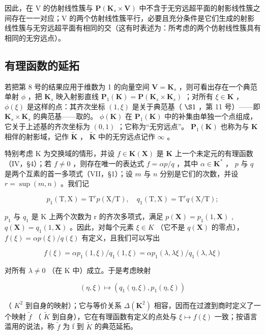 因此，在 V 的仿射线性簇与 \(\mathbf{P}(\mathbf{K}_{s} \times \mathbf{V})\) 中不含于无穷远超平面的射影线性簇之间存在一一对应；V 的两个仿射线性簇平行，必要且充分条件是它们生成的射影线性簇与无穷远超平面有相同的交（这有时表述为：所考虑的两个仿射线性簇具有相同的无穷远点）。

\subsection{有理函数的延拓}

若把第 8 号的结果应用于维数为 1 的向量空间 \(\mathbf{V} = \mathbf{K}_s\) ，则可看出存在一个典范单射 \(\phi\) ，把 \(\mathbf{K}_s\) 映入射影直线 \(\mathbf{P}_1(\mathbf{K}) = \mathbf{P}(\mathbf{K}_s \times \mathbf{K}_s)\) ；对所有 \(\xi \in \mathbf{K}\) ， \(\phi(\xi)\) 是这样的点：其齐次坐标 \((1, \xi)\) 是关于典范基（ \(\S 1\) ，第 11 号）——即 \(\mathbf{K}_s \times \mathbf{K}_s\) 的典范基——取的。 \(\phi(\mathbf{K})\) 在 \(\mathbf{P}_1(\mathbf{K})\) 中的补集由单独一个点组成，它关于上述基的齐次坐标为 \((0, 1)\) ；它称为“无穷远点”。 \(\mathbf{P}_1(\mathbf{K})\) 也称为与 \(\mathbf{K}\) 相伴的射影域，记作 \(\tilde{\mathbf{K}}\) ， \(\tilde{\mathbf{K}}\) 中的无穷远点记作 \(\infty\) 。

特别考虑 K 为交换域的情形，并设 \(f \in \mathbf{K}(\mathbf{X})\) 是 \(\mathbf{K}\) 上一个未定元的有理函数（IV，§4）；若 \(f \neq 0\) ，则存在唯一的表达式 \(f = \alpha p/q\) ，其中 \(\alpha \in \mathbf{K}^*\) ， \(p\) 与 \(q\) 是两个互素的首一多项式（VII，§1）；设 \(m\) 与 \(n\) 分别是它们的次数，并设 \(r = \sup(m, n)\) 。我们记

\[
p _ {1} (\mathrm{T}, \mathrm{X}) = \mathrm{T} ^ {r} p (\mathrm{X} / \mathrm{T}), \quad q _ {1} (\mathrm{T}, \mathrm{X}) = \mathrm{T} ^ {r} q (\mathrm{X} / \mathrm{T});
\]

\(p_{1}\) 与 \(q_{1}\) 是 K 上两个次数为 r 的齐次多项式，满足 \(p(\mathbf{X}) = p_{1}(1, \mathbf{X})\) , \(q(\mathbf{X}) = q_{1}(1, \mathbf{X})\) 。因此，对每个元素 \(\xi \in K\) （它不是 \(q(\mathbf{X})\) 的零点）， \(f(\xi) = \alpha p(\xi)/q(\xi)\) 有定义，且我们可以写出

\[
f (\xi) = \alpha p _ {1} (1, \xi) / q _ {1} (1, \xi) = \alpha p _ {1} (\lambda , \lambda \xi) / q _ {1} (\lambda , \lambda \xi)
\]

对所有 \(\lambda \neq 0\) （在 K 中）成立。于是考虑映射

\[
(\eta , \xi) \mapsto (q _ {1} (\eta , \xi), p _ {1} (\eta , \xi))
\]

（ \(K^{2}\) 到自身的映射）；它与等价关系 \(\Delta(\mathbf{K}^{2})\) 相容，因而在过渡到商时定义了一个映射 \(\tilde{f}\) （ \(\tilde{K}\) 到自身），它在有理函数有定义的点处与 \(\xi\mapsto f(\xi)\) 一致；按语言滥用的说法，称 \(\tilde{f}\) 为 f 到 \(\tilde{K}\) 的典范延拓。

